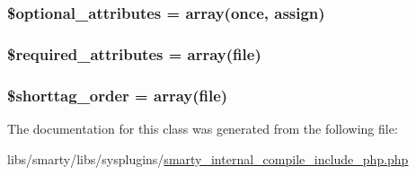 \subsubsection[{\$optional\+\_\+attributes}]{\setlength{\rightskip}{0pt plus 5cm}\$optional\+\_\+attributes = array(\textquotesingle{}once\textquotesingle{}, \textquotesingle{}assign\textquotesingle{})}\label{class_smarty___internal___compile___include___php_a899d1eb4a6fecbd6ce696adb171c80a4}
\hypertarget{class_smarty___internal___compile___include___php_ae799507d5461de485f3a618abeecea95}{}
\subsubsection[{\$required\+\_\+attributes}]{\setlength{\rightskip}{0pt plus 5cm}\$required\+\_\+attributes = array(\textquotesingle{}file\textquotesingle{})}\label{class_smarty___internal___compile___include___php_ae799507d5461de485f3a618abeecea95}
\hypertarget{class_smarty___internal___compile___include___php_a2ccb25269c3a92e8c4796c7ef23725e6}{}
\subsubsection[{\$shorttag\+\_\+order}]{\setlength{\rightskip}{0pt plus 5cm}\$shorttag\+\_\+order = array(\textquotesingle{}file\textquotesingle{})}\label{class_smarty___internal___compile___include___php_a2ccb25269c3a92e8c4796c7ef23725e6}


The documentation for this class was generated from the following file\+:\begin{DoxyCompactItemize}
\item 
libs/smarty/libs/sysplugins/\hyperlink{smarty__internal__compile__include__php_8php}{smarty\+\_\+internal\+\_\+compile\+\_\+include\+\_\+php.\+php}\end{DoxyCompactItemize}
